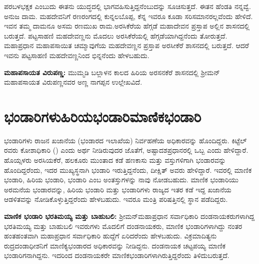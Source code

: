 ಪರಬಳಭಕ್ಷಕ ಎಂಬುದು ಈತನು ಯುದ್ಧದಲ್ಲಿ ಭಾಗವಹಿಸುತ್ತಿದ್ದನೆಂಬುದನ್ನು ಸೂಚಿಸುತ್ತದೆ. ಈತನ ಹೆಂಡತಿ ನನ್ನವ್ವೆ. ಅನುಜ ದಾಮ. ಮಹದೇವನಿಗೆ ರಣರಂಗದಲ್ಲಿ ಕುನ್ನಲಬೊಪ್ಪ, ಕೆನ್ನ ಇವರೂ ಕೂಡಾ ಸರಿಸಮಾನರಲ್ಲವೆಂದು ಹೇಳಿದೆ. ಇವನ ತಮ್ಮ ದಾಮನೂ ಅಸಮ ರಣಮುಖ ರಾಮ.ಅರಸಿಕೆರೆಯ ಹೆಗ್ಗಡೆ ಮಹಾದೇವನ ಪ್ರಸ್ತಾಪ ಅಲ್ಲಿನ ಶಾಸನದಲ್ಲಿ ಬರುತ್ತದೆ. ಪಟ್ಟಸಾಹಣಿ ಮಹದೇವಣ್ಣನು ಮೊದಲು ಅರಸಿಕೆರೆಯಲ್ಲಿ ಹೆಗ್ಗಡೆಯಾಗಿದ್ದನೆಂದು ತೋರುತ್ತದೆ. ಮಹಾಪ್ರಧಾನ ಮಹಾಪಸಾಯಿತ ಚಮ್ಮಾವುಗೆಯ ಮಹದೇವಣ್ಣನ ಪ್ರಸ್ತಾಪ ಅರಸೀಕೆರೆ ಶಾಸನದಲ್ಲಿ ಬರುತ್ತದೆ. ಆದರೆ ಇವನು ಪಟ್ಟಸಾಹಣಿ ಮಹದೇವಣ್ಣನಿಂದ ಭಿನ್ನನೆಂದು ಹೇಳಬಹುದು.

\textbf{ಮಹಾಪಸಾಯತ ವಿರುಪಣ್ಣ:} ಮುಮ್ಮಡಿ ಬಲ್ಲಾಳನ ಕಾಲದ ಹಿರಿಯ ಅರಸನಕೆರೆ ಶಾಸನದಲ್ಲಿ ಶ‍್ರೀಮನ್​ ಮಹಾಪಸಾಯತ ವಿರುಪಣ್ಣನವರ ಅಣ್ಣ ನಾಗಪ್ಪನ ಉಲ್ಲೇಖವಿದೆ.


\section{ಭಂಡಾರಿಗಳು\enginline{-}ಹಿರಿಯಭಂಡಾರಿ\enginline{-}ಮಾಣಿಕಭಂಡಾರಿ}

ಭಂಡಾರಿಗಳು ರಾಜನ ಖಜಾನೆಯ (ಭಂಡಾರದ ಇಲಾಖೆಯ) ನಿರ್ವಹಣೆಯ ಅಧಿಕಾರವನ್ನು ಹೊಂದಿದ್ದರು. ಕಿಟ್ಟೆಲ್​ರವರು ಕೋಶಾಧಿಕಾರಿ () ಎಂದು ಅರ್ಥ ನೀಡಿರುವುದರ ಜೊತೆಗೆ, ಅಷ್ಟಾದಶಪ್ರಧಾನರಲ್ಲಿ ಒಬ್ಬ ಎಂದು ಹೇಳಿದ್ದಾರೆ. ಹೊಯ್ಸಳರು ಅರಸಿಯಕೆರೆ, ಹಲಕೂರು ಮುಂತಾದ ಕಡೆ ಹಣಕಾಸು ಮತ್ತು ವಸ್ತುಗಳಿಗಾಗಿ ಭಂಡಾರವನ್ನು ಹೊಂದಿದ್ದರೆಂದು, ಇದರ ಮುಖ್ಯಸ್ಥನಾಗಿ ಭಂಡಾರಿ ಇರುತ್ತಿದ್ದನೆಂದು, ದೀಕ್ಷಿತ್​ ಅವರು ಹೇಳಿದ್ದಾರೆ. ಇವರಲ್ಲಿ ಮಾಣಿಕ ಭಂಡಾರಿ, ಹಿರಿಯ ಭಂಡಾರಿ, ಭಂಡಾರಿ ಎಂಬ ಅಂತಸ್ತುಗಳನ್ನು ನಾವು ನೋಡಬಹುದು. ಮಾಣಿಕ ಭಂಡಾರಿಯು ಅರಮನೆಯ ಭಂಡಾರವನ್ನು, ಹಿರಿಯ ಭಂಡಾರಿ ಮತ್ತು ಭಂಡಾರಿಗಳು ರಾಜ್ಯದ ಇತರ ಕಡೆ ಇದ್ದ ಖಜಾನೆಯ ಆಡಳಿತವನ್ನು ನೋಡಿಕೊಳ್ಳುತ್ತಿದ್ದರೆಂದು ಹೇಳಬಹುದು. ಇವರೂ ಮಂತ್ರಿ ಪರಿಷತ್ತಿನಲ್ಲಿ ಸ್ಥಾನ ಪಡೆದಿದ್ದರು.

\textbf{ಮಾಣಿಕ ಭಂಡಾರಿ ಭರತಿಮಯ್ಯ ಮತ್ತು ಬಾಹುಬಲಿ:} ಶ‍್ರೀಮನ್​ಮಹಾಪ್ರಧಾನ ಸರ್ವಾಧಿಕಾರಿ ದಂಡನಾಯಕರು\-ಗಳಾಗಿದ್ದ ಭರತಿಮಯ್ಯ ಮತ್ತು ಬಾಹುಬಲಿ ಇವರುಗಳು ಮೊದಲಿಗೆ ದಂಡನಾಯಕರು, ಮಾಣಿಕ ಭಂಡಾರಿಗಳಾಗಿದ್ದು ನಂತರ ಹಂತಹಂತವಾಗಿ ಮಹಾಪ್ರಧಾನ ಸರ್ವಾಧಿಕಾರಿ ಹುದ್ದೆಗೆ ಏರಿದರೆಂದು ಹೇಳಬಹುದು. ವಿಕ್ರಮಾದಿತ್ಯನು ರುದ್ರದಂಡಾಧೀಶ\-ನಿಗೆ ಮಾಣಿಕ್ಯಭಂಡಾರದ ಅಧಿಕಾರವನ್ನು ನೀಡಿದ್ದನು. ದಂಡನಾಯಕ ಚಟ್ಟಪಯ್ಯ ಮಾಣಿಕ ಭಂಡಾರಿಗನಾಗಿದ್ದನು. ಇದರಿಂದ ದಂಡನಾಯಕರೇ ಮಾಣಿಕಭಂಡಾರಿಗಳಾಗಿರುತ್ತಿದ್ದರೆಂದು ತಿಳಿದುಬರುತ್ತದೆ.

